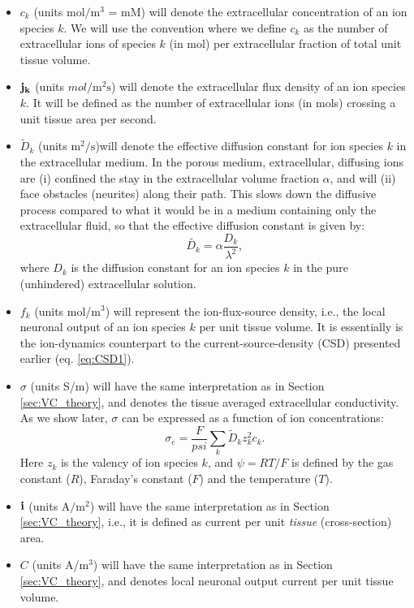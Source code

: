 \begin{itemize}
\item $c_k$ (units $\mathrm{mol/m^3}$ = mM) will denote the extracellular concentration of an ion species $k$. We will use the convention where we define $c_k$ as the number of extracellular ions of species $k$ (in mol) per extracellular fraction of total unit tissue volume. 

\item ${\bf j_k}$ (units $mol/\mathrm{m^2s}$) will denote the extracellular flux density of an ion species $k$. It will be defined as the number of extracellular ions (in mols) crossing a unit tissue area per second. 

\item $\tilde{D}_k$ (units $\mathrm{m^2/s}$)will denote the effective diffusion constant for ion species $k$ in the extracellular medium. In the porous medium, extracellular, diffusing ions are (i) confined the stay in the extracellular volume fraction $\alpha$, and will (ii) face obstacles (neurites) along their path. This slows down the diffusive process compared to what it would be in a medium containing only the extracellular fluid, so that the effective diffusion constant is given by:
\begin{equation}
\tilde{D_k} = \alpha \frac{D_k}{\lambda^2}, 
\label{eq:diffconst}
\end{equation}
where $D_k$ is the diffusion constant for an ion species $k$ in the pure (unhindered) extracellular solution.

\item $f_k$ (units mol/m$^3$) will represent the ion-flux-source density, i.e., the local neuronal output of an ion species $k$ per unit tissue volume. It is essentially is the ion-dynamics counterpart to the current-source-density (CSD) presented earlier (eq. \ref{eq:CSD1}).

\item $\sigma$ (units S/m) will have the same interpretation as in Section \ref{sec:VC_theory}, and denotes the tissue averaged extracellular conductivity. As we show later, $\sigma$ can be expressed as a function of ion concentrations:
\begin{equation}
\sigma_e = \frac{F}{psi}\sum_{k} \tilde{D}_k z_{k}^2 c_{k}.
\label{eq:sigma1}
\end{equation}
Here $z_{k}$ is the valency of ion species $k$, and $\psi=RT/F$ is defined by the gas constant ($R$), Faraday's constant ($F$) and the temperature ($T$).

\item  ${\bf i}$ (units $\mathrm{A/m^2}$) will have the same interpretation as in Section \ref{sec:VC_theory}, i.e., it is defined as current per unit \textit{tissue} (cross-section) area.

\item $C$ (units A/m$^3$) will have the same interpretation as in Section \ref{sec:VC_theory}, and denotes local neuronal output current per unit tissue volume.

\end{itemize}

